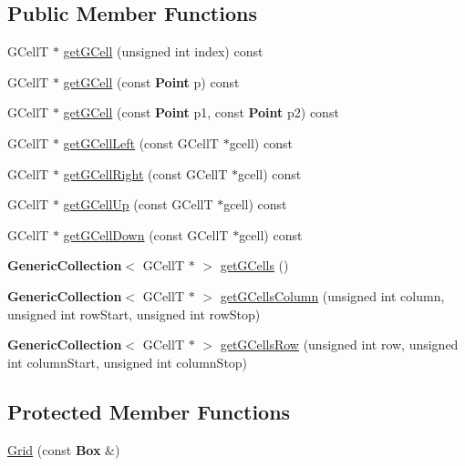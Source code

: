 \subsection*{Public Member Functions}
\begin{DoxyCompactItemize}
\item 
G\+CellT $\ast$ \hyperlink{classKatabatic_1_1Grid_a98650c11b4aa0c6107c4d890dff61587}{get\+G\+Cell} (unsigned int index) const
\item 
G\+CellT $\ast$ \hyperlink{classKatabatic_1_1Grid_a0ee3cd2fb8c66458b0d00e39826921da}{get\+G\+Cell} (const \textbf{ Point} p) const
\item 
G\+CellT $\ast$ \hyperlink{classKatabatic_1_1Grid_a1beb5c490b2e651eab49178297b6cda2}{get\+G\+Cell} (const \textbf{ Point} p1, const \textbf{ Point} p2) const
\item 
G\+CellT $\ast$ \hyperlink{classKatabatic_1_1Grid_ae5041816e75468b69bb0bbf24a4e8eca}{get\+G\+Cell\+Left} (const G\+CellT $\ast$gcell) const
\item 
G\+CellT $\ast$ \hyperlink{classKatabatic_1_1Grid_a0e9bba0feb437dca932d59703298358e}{get\+G\+Cell\+Right} (const G\+CellT $\ast$gcell) const
\item 
G\+CellT $\ast$ \hyperlink{classKatabatic_1_1Grid_a3a22f2bce9124765eb937b78c90059a0}{get\+G\+Cell\+Up} (const G\+CellT $\ast$gcell) const
\item 
G\+CellT $\ast$ \hyperlink{classKatabatic_1_1Grid_a4288eb8b1357d9800341b82df6b23944}{get\+G\+Cell\+Down} (const G\+CellT $\ast$gcell) const
\item 
\textbf{ Generic\+Collection}$<$ G\+CellT $\ast$ $>$ \hyperlink{classKatabatic_1_1Grid_a24b4ab5b46b56ee744cf4c368a114d95}{get\+G\+Cells} ()
\item 
\textbf{ Generic\+Collection}$<$ G\+CellT $\ast$ $>$ \hyperlink{classKatabatic_1_1Grid_aa8d0393323104d48c089a8429b254689}{get\+G\+Cells\+Column} (unsigned int column, unsigned int row\+Start, unsigned int row\+Stop)
\item 
\textbf{ Generic\+Collection}$<$ G\+CellT $\ast$ $>$ \hyperlink{classKatabatic_1_1Grid_a35e2075302cdb696945f05c5bcc817a0}{get\+G\+Cells\+Row} (unsigned int row, unsigned int column\+Start, unsigned int column\+Stop)
\end{DoxyCompactItemize}
\subsection*{Protected Member Functions}
\begin{DoxyCompactItemize}
\item 
\hyperlink{classKatabatic_1_1Grid_a1b772cc784f7110caca47acb76dcec62}{Grid} (const \textbf{ Box} \&)
\end{DoxyCompactItemize}


